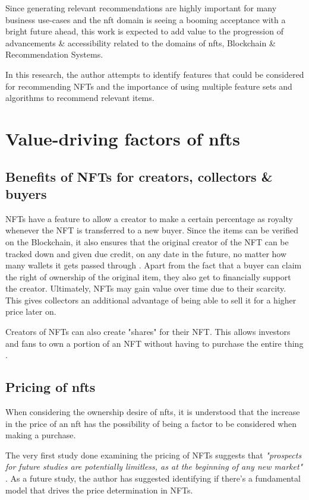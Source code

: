 \documentclass[conference]{IEEEtran}
\begin{document}
\bigbreak
Since generating relevant recommendations are highly important for many business use-cases and the \gls{nft} domain is seeing a booming acceptance with a bright future ahead, this work is expected to add value to the progression of advancements \& accessibility related to the domains of \gls{nft}s, Blockchain \& Recommendation Systems.

 In this research, the author attempts to identify features that could be considered for recommending NFTs and the importance of using multiple feature sets and algorithms to recommend relevant items.


\section{Value-driving factors of \gls{nft}s}

\subsection{Benefits of NFTs for creators, collectors \& buyers}
NFTs have a feature to allow a creator to make a certain percentage as royalty whenever the NFT is transferred to a new buyer. Since the items can be verified on the Blockchain, it also ensures that the original creator of the NFT can be tracked down and given due credit, on any date in the future, no matter how many wallets it gets passed through \autocite{chevet_blockchain_2018}. Apart from the fact that a buyer can claim the right of ownership of the original item, they also get to financially support the creator. Ultimately, NFTs may gain value over time due to their scarcity. This gives collectors an additional advantage of being able to sell it for a higher price later on.

Creators of NFTs can also create "shares" for their NFT. This allows investors and fans to own a portion of an NFT without having to purchase the entire thing \autocite{noauthor_erc-721_nodate}.

\subsection{Pricing of \gls{nft}s}

When considering the ownership desire of \gls{nft}s, it is understood that the increase in the price of an \gls{nft} has the possibility of being a factor to be considered when making a purchase.

The very first study done examining the pricing of NFTs suggests that \emph{"prospects for future studies are potentially limitless, as at the beginning of any new market"} \autocite{dowling_fertile_2021}. As a future study, the author has suggested identifying if there's a fundamental model that drives the price determination in NFTs.
\end{document}
